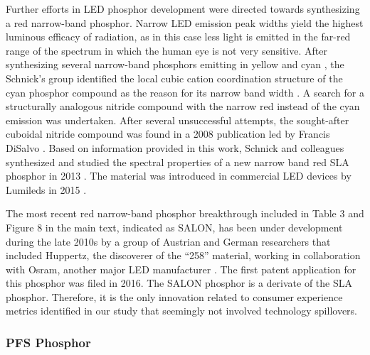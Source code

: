 \documentclass[10pt]{article}
\begin{document}
Further efforts in LED phosphor development were directed towards synthesizing a red narrow-band phosphor. Narrow LED emission peak widths yield the highest luminous efficacy of radiation, as in this case less light is emitted in the far-red range of the spectrum in which the human eye is not very sensitive. After synthesizing several narrow-band phosphors emitting in yellow \cite{Hppe2004} and cyan \cite{Kechele2009}, the Schnick’s group identified the local cubic cation coordination structure of the cyan phosphor compound as the reason for its narrow band width \cite{lumi2016narrow}. A search for a structurally analogous nitride compound with the narrow red instead of the cyan emission was undertaken. After several unsuccessful attempts, the sought-after cuboidal nitride compound was found in a 2008 publication led by Francis DiSalvo \cite{Park2008Sr}. Based on information provided in this work, Schnick and colleagues synthesized and studied the spectral properties of a new narrow band red SLA phosphor in 2013 \cite{schmidt2013new}\cite{Pust2014}\cite{schmidt2017phosphors}. The material was introduced in commercial LED devices by Lumileds in 2015 \cite{lumi2016narrow_whitepaper}. 

The most recent red narrow-band phosphor breakthrough included in Table 3 and Figure 8 in the main text, indicated as SALON, has been under development during the late 2010s by a group of Austrian and German researchers that included Huppertz, the discoverer of the “258” material, working in collaboration with Osram, another major LED manufacturer \cite{seibald2019phosphor}\cite{Hoerder2019}\cite{Hoerder2020}. The first patent application for this phosphor was filed in 2016. The SALON phosphor is a derivate of the SLA phosphor. Therefore, it is the only innovation related to consumer experience metrics identified in our study that seemingly not involved technology spillovers.

\subsubsection{PFS Phosphor}
\end{document}
